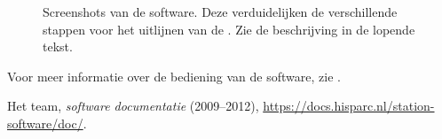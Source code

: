 \begin{figure}
\centering
{}
\hfill
{}
\hfill
{}

\vspace{1em}

\hfill
{}
\hfill
{}
\caption{Screenshots van de \daq software.  Deze verduidelijken de
verschillende stappen voor het uitlijnen van de \adcs.  Zie de
beschrijving in de lopende tekst.}
\end{figure}

Voor meer informatie over de bediening van de \daq software, zie
\cite{software-handleiding}.


\begin{thebibliography}{9}
 Het \hisparc team, \emph{\hisparc software
documentatie} (2009--2012),
\url{https://docs.hisparc.nl/station-software/doc/}.
\end{thebibliography}


